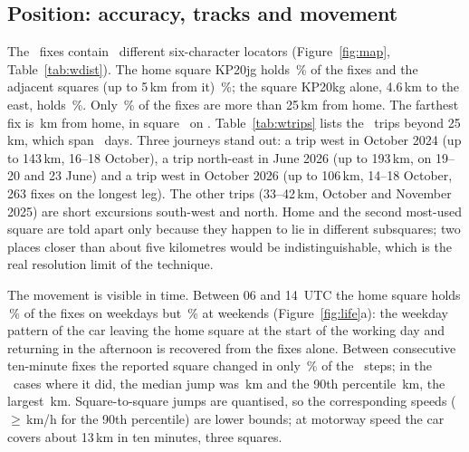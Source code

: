 \documentclass[10pt,a4paper]{article}
\begin{document}
\subsection{Position: accuracy, tracks and movement}
The \wFixes\ fixes contain \wLocs\ different six-character locators (Figure~\ref{fig:map}, Table~\ref{tab:wdist}). The home square KP20jg holds \wHomePct\,\% of the fixes and the adjacent squares (up to 5\,km from it) \wNear\,\%; the square KP20kg alone, 4.6\,km to the east, holds \wKPCAkg\,\%. Only \wFar\,\% of the fixes are more than 25\,km from home. The farthest fix is \wMaxDist\,km from home, in square \wMaxLoc\ on \wMaxDate. Table~\ref{tab:wtrips} lists the \wTrips\ trips beyond 25\,km, which span \wTripDays\ days. Three journeys stand out: a trip west in October 2024 (up to 143\,km, 16--18 October), a trip north-east in June 2026 (up to 193\,km, on 19--20 and 23 June) and a trip west in October 2026 (up to 106\,km, 14--18 October, 263 fixes on the longest leg). The other trips (33--42\,km, October and November 2025) are short excursions south-west and north. Home and the second most-used square are told apart only because they happen to lie in different subsquares; two places closer than about five kilometres would be indistinguishable, which is the real resolution limit of the technique.

The movement is visible in time. Between 06 and 14~UTC the home square holds \wHomeWk\,\% of the fixes on weekdays but \wHomeWe\,\% at weekends (Figure~\ref{fig:life}a): the weekday pattern of the car leaving the home square at the start of the working day and returning in the afternoon is recovered from the fixes alone. Between consecutive ten-minute fixes the reported square changed in only \wChangePct\,\% of the \wSteps\ steps; in the \wMoves\ cases where it did, the median jump was \wMoveMed\,km and the 90th percentile \wMovePJA\,km, the largest \wMoveMax\,km. Square-to-square jumps are quantised, so the corresponding speeds ($\ge$\wSpeedPJA\,km/h for the 90th percentile) are lower bounds; at motorway speed the car covers about 13\,km in ten minutes, three squares.



\end{document}
